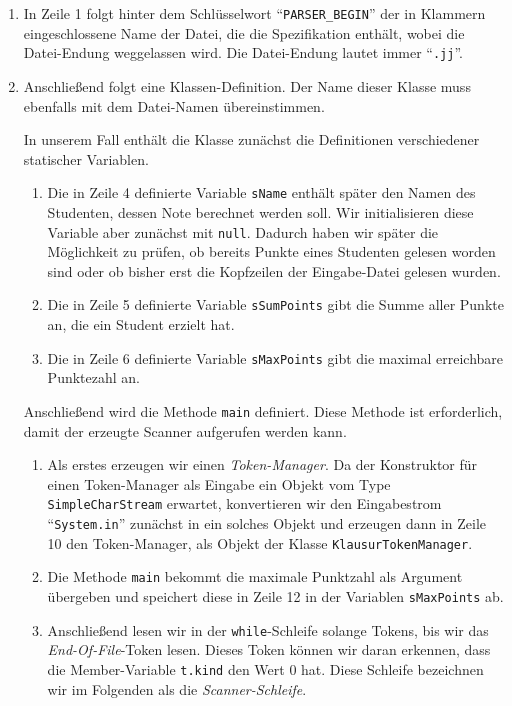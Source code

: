\begin{enumerate}
\item In Zeile 1 folgt hinter dem Schl\"usselwort ``\texttt{PARSER\_BEGIN}'' der in Klammern
      eingeschlossene Name der Datei, die die Spezifikation enth\"alt, wobei die
      Datei-Endung weggelassen wird.  Die Datei-Endung lautet immer ``\texttt{.jj}''.
\item Anschlie{\ss}end folgt eine Klassen-Definition.  Der Name dieser Klasse muss ebenfalls
      mit dem Datei-Namen \"ubereinstimmen.
  
      In unserem Fall enth\"alt die Klasse zun\"achst die Definitionen verschiedener
      statischer Variablen.
      \begin{enumerate}
      \item Die in Zeile 4 definierte Variable \texttt{sName} enth\"alt sp\"ater den Namen 
            des Studenten, dessen Note berechnet werden soll.  Wir initialisieren diese
            Variable aber zun\"achst mit \texttt{null}.  Dadurch haben wir sp\"ater die
            M\"oglichkeit zu pr\"ufen, ob bereits Punkte eines Studenten gelesen worden sind
            oder ob bisher erst die Kopfzeilen der Eingabe-Datei gelesen wurden.
      \item Die in Zeile 5 definierte Variable \texttt{sSumPoints} gibt die Summe aller
            Punkte an, die ein Student erzielt hat.
      \item Die in Zeile 6 definierte Variable \texttt{sMaxPoints} gibt die maximal erreichbare Punktezahl an.
      \end{enumerate}
      Anschlie{\ss}end wird die Methode \texttt{main} definiert.  Diese Methode ist erforderlich, damit
      der erzeugte Scanner aufgerufen werden kann.  
      \begin{enumerate}
      \item Als erstes erzeugen wir einen \emph{Token-Manager}.  Da der Konstruktor 
            f\"ur einen Token-Manager als Eingabe ein Objekt vom Type
            \texttt{SimpleCharStream} erwartet, 
            konvertieren wir den Eingabestrom ``\texttt{System.in}'' zun\"achst in ein solches
            Objekt und erzeugen dann in Zeile 10 den Token-Manager, als Objekt der
            Klasse \texttt{KlausurTokenManager}.  
      \item Die Methode \texttt{main} bekommt die maximale Punktzahl als Argument
            \"ubergeben und speichert diese in Zeile 12 in der Variablen \texttt{sMaxPoints}
            ab.
      \item Anschlie{\ss}end lesen wir in der \texttt{while}-Schleife solange Tokens, bis wir
            das \textsl{End-Of-File}-Token lesen.  Dieses Token k\"onnen wir daran erkennen,
            dass die Member-Variable \texttt{t.kind} den Wert 0 hat.
            Diese Schleife bezeichnen wir im Folgenden als die \emph{Scanner-Schleife}.
       

\end{enumerate}
\end{enumerate}
